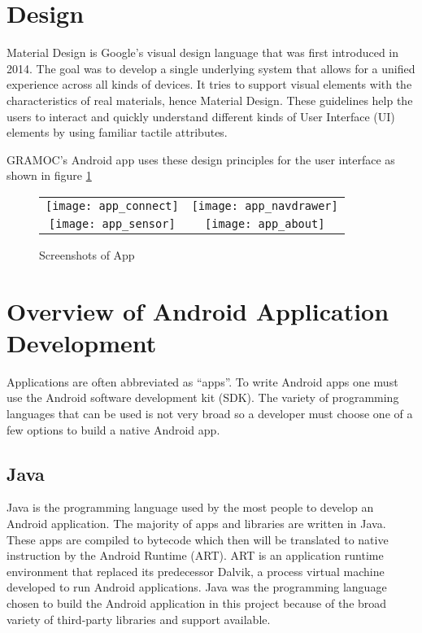 \section{Design}
Material Design is Google's visual design language that was first introduced in 2014. The goal was to develop a single underlying system that allows for a unified experience across all kinds of devices. It tries to support visual elements with the characteristics of real materials, hence Material Design. These guidelines help the users to interact and quickly understand different kinds of User Interface (UI) elements by using familiar tactile attributes.

GRAMOC's Android app uses these design principles for the user interface as shown in figure \ref{fig:appscreenshots}

\begin{figure}[H]
    \centering
    \begin{tabular}{cc}
    \texttt{[image: app\_connect]}
    &
    \texttt{[image: app\_navdrawer]}
    \\
    \texttt{[image: app\_sensor]}
    &
    \texttt{[image: app\_about]}
    \end{tabular}
    \caption{Screenshots of App}
    \label{fig:appscreenshots}
\end{figure}

\section{Overview of Android Application Development}
Applications are often abbreviated as ``apps''. To write Android apps one must use the Android software development kit (SDK). The variety of programming languages that can be used is not very broad so a developer must choose one of a few options to build a native Android app.

\subsection{Java}
Java is the programming language used by the most people to develop an Android application. The majority of apps and libraries are written in Java. These apps are compiled to bytecode which then will be translated to native instruction by the Android Runtime (ART). ART is an application runtime environment that replaced its predecessor Dalvik, a process virtual machine developed to run Android applications. Java was the programming language chosen to build the Android application in this project because of the broad variety of third-party libraries and support available.

